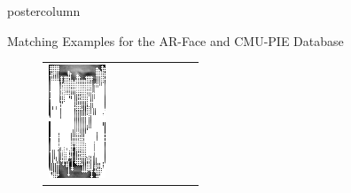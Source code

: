 \documentclass[final,hyperref={pdfpagelabels=false}]{beamer}
\begin{document}
\begin{frame}
\begin{columns}
\begin{column}{.49\textwidth}
\begin{beamercolorbox}[center,wd=\textwidth]{postercolumn}
\begin{minipage}[T]{.95\textwidth}
{\begin{block}{Matching Examples for the AR-Face and CMU-PIE Database}
\begin{figure}
\begin{tabular}{p{.09\linewidth} | p{.12\linewidth} | p{.12\linewidth} | p{.12\linewidth} || p{.12\linewidth} | p{.12\linewidth} | p{.12\linewidth} | p{.09\linewidth} }
                  \includegraphics[width=1.0\linewidth]{paper/bmvc09-surf/figures/matchings/arface-usift/grid-best_m-005-17.pgm--m-005-4}
                  &

\end{tabular}
\end{figure}
\end{block}}
\end{minipage}
\end{beamercolorbox}
\end{column}
\end{columns}
\end{frame}
\end{document}
